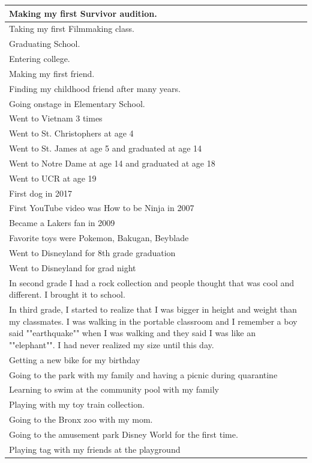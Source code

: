 \documentclass[
  .7em,
  letterpaper,
  DIV=11,
  numbers=noendperiod]{scrartcl}
\begin{document}
\begin{table}
\begin{tabular}{l}
\hline
Making my first Survivor audition.\\
\hline
Taking my first Filmmaking class.\\
\hline
Graduating School.\\
\hline
Entering college.\\
\hline
Making my first friend.\\
\hline
Finding my childhood friend after many years.\\
\hline
Going onstage in Elementary School.\\
\hline
Went to Vietnam 3 times\\
\hline
Went to St. Christophers at age 4\\
\hline
Went to St. James at age 5 and graduated at age 14\\
\hline
Went to Notre Dame at age 14 and graduated at age 18\\
\hline
Went to UCR at age 19\\
\hline
First dog in 2017\\
\hline
First YouTube video was How to be Ninja in 2007\\
\hline
Became a Lakers fan in 2009\\
\hline
Favorite toys were Pokemon, Bakugan, Beyblade\\
\hline
Went to Disneyland for 8th grade graduation\\
\hline
Went to Disneyland for grad night\\
\hline
In second grade I had a rock collection and people thought that was cool and different. I brought it to school.\\
\hline
In third grade, I started to realize that I was bigger in height and weight than my classmates. I was walking in the portable classroom and I remember a boy said ""earthquake"" when I was walking and they said I was like an ""elephant"". I had never realized my size until this day.\\
\hline
Getting a new bike for my birthday\\
\hline
Going to the park with my family and having a picnic during quarantine\\
\hline
Learning to swim at the community pool with my family\\
\hline
Playing with my toy train collection.\\
\hline
Going to the Bronx zoo with my mom.\\
\hline
Going to the amusement park Disney World for the first time.\\
\hline
Playing tag with my friends at the playground\\

\end{tabular}
\end{table}
\end{document}
